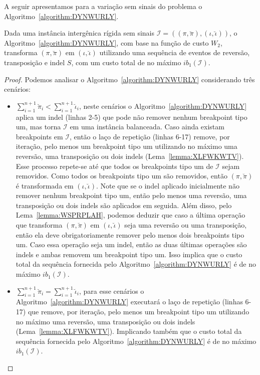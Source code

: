 A seguir apresentamos para a variação sem sinais do problema \SbWIRTI{} o Algoritmo~\ref{algorithm:DYNWURLY}.



\begin{lemma}\label{lemma:IKTEYDRR}
Dada uma instância intergênica rígida sem sinais $\mathcal{I}=((\pi,\breve\pi),(\iota,\breve\iota))$, o Algoritmo~\ref{algorithm:DYNWURLY}, com base na função de custo $W_2$, transforma $(\pi,\breve\pi)$ em $(\iota,\breve\iota)$ utilizando uma sequência de eventos de reversão, transposição e indel $S$, com um custo total de no máximo $ib_1(\mathcal{I})$.
\end{lemma}
\begin{proof}
  Podemos analisar o Algoritmo~\ref{algorithm:DYNWURLY} considerando três cenários:
  \begin{itemize}
    \item $\sum_{i=1}^{n+1}\breve\pi_i < \sum_{i=1}^{n+1}\breve\iota_i$, neste cenários o Algoritmo~\ref{algorithm:DYNWURLY} aplica um indel (linhas 2-5) que pode não remover nenhum breakpoint tipo um, mas torna $\mathcal{I}$ em uma instância balanceada. Caso ainda existam breakpoints em $\mathcal{I}$, então o laço de repetição (linhas 6-17) remove, por iteração, pelo menos um breakpoint tipo um utilizando no máximo uma reversão, uma transposição ou dois indels (Lema~\ref{lemma:XLFWKWTV}). Esse processo repete-se até que todos os breakpoints tipo um de $\mathcal{I}$ sejam removidos. Como todos os breakpoints tipo um são removidos, então $(\pi,\breve\pi)$ é transformada em $(\iota,\breve\iota)$. Note que se o indel aplicado inicialmente não remover nenhum breakpoint tipo um, então pelo menos uma reversão, uma transposição ou dois indels são aplicados em seguida. Além disso, pelo Lema~\ref{lemma:WSPRPLAH}, podemos deduzir que caso a última operação que transforma $(\pi,\breve\pi)$ em $(\iota,\breve\iota)$ seja uma reversão ou uma transposição, então ela deve obrigatoriamente remover pelo menos dois breakpoints tipo um. Caso essa operação seja um indel, então as duas últimas operações são indels e ambas removem um breakpoint tipo um. Isso implica que o custo total da sequência fornecida pelo Algoritmo~\ref{algorithm:DYNWURLY} é de no máximo $ib_1(\mathcal{I})$.
    \item $\sum_{i=1}^{n+1}\breve\pi_i = \sum_{i=1}^{n+1}\breve\iota_i$, para esse cenários o Algoritmo~\ref{algorithm:DYNWURLY} executará o laço de repetição (linhas 6-17) que remove, por iteração, pelo menos um breakpoint tipo um utilizando no máximo uma reversão, uma transposição ou dois indels (Lema~\ref{lemma:XLFWKWTV}). Implicando também que o custo total da sequência fornecida pelo Algoritmo~\ref{algorithm:DYNWURLY} é de no máximo $ib_1(\mathcal{I})$.

\end{itemize}
\end{proof}
